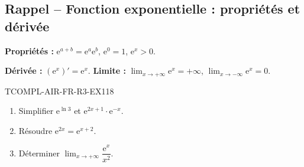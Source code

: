 

\subsection*{Rappel -- Fonction exponentielle : propriétés et dérivée}

\textbf{Propriétés :} $\mathrm{e}^{a+b} = \mathrm{e}^a \mathrm{e}^b$, $\mathrm{e}^0 = 1$, $\mathrm{e}^x > 0$.

\textbf{Dérivée :} $(\mathrm{e}^x)' = \mathrm{e}^x$. \textbf{Limite :} $\lim_{x \to +\infty} \mathrm{e}^x = +\infty$, $\lim_{x \to -\infty} \mathrm{e}^x = 0$.

\begin{exercice}{TCOMPL-AIR-FR-R3-EX1}{1}{8}
\begin{enumerate}
  \item Simplifier $\mathrm{e}^{\ln 3}$ et $\mathrm{e}^{2x + 1} \cdot \mathrm{e}^{-x}$.
  \item Résoudre $\mathrm{e}^{2x} = \mathrm{e}^{x+2}$.
  \item Déterminer $\lim_{x \to +\infty} \dfrac{\mathrm{e}^x}{x^2}$.
\end{enumerate}
\end{exercice}

